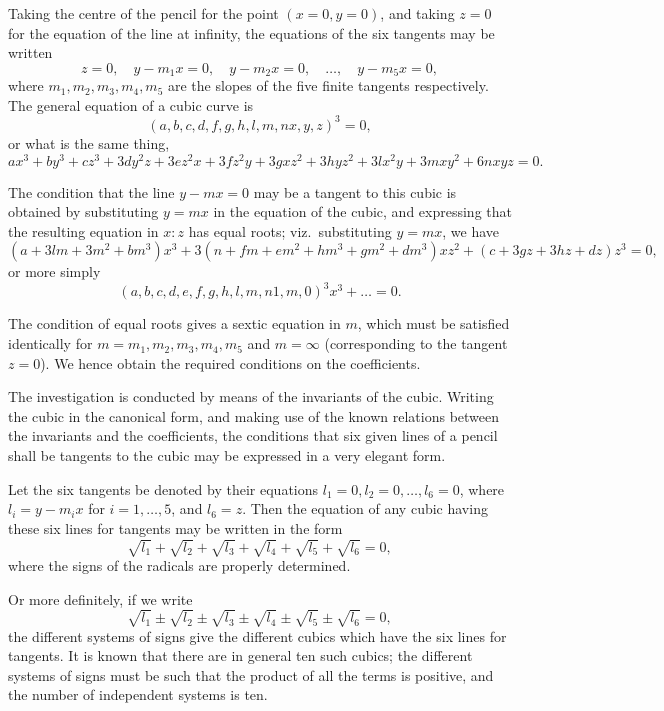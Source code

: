 \documentclass[11pt,a4paper]{article}
\theoremstyle{definition}
\begin{document}
Taking the centre of the pencil for the point $(x=0, y=0)$, and taking $z=0$ for the equation of the line at infinity, the equations of the six tangents may be written
\[
z = 0,\quad y - m_1x = 0,\quad y - m_2x = 0,\quad \dots,\quad y - m_5x = 0,
\]
where $m_1, m_2, m_3, m_4, m_5$ are the slopes of the five finite tangents respectively. The general equation of a cubic curve is
\[
(a,b,c,d,f,g,h,l,m,n x,y,z)^3 = 0,
\]
or what is the same thing,
\[
ax^3 + by^3 + cz^3 + 3dy^2z + 3ez^2x + 3fz^2y + 3gxz^2 + 3hyz^2 + 3lx^2y + 3mxy^2 + 6nxyz = 0.
\]

The condition that the line $y - mx = 0$ may be a tangent to this cubic is obtained by substituting $y = mx$ in the equation of the cubic, and expressing that the resulting equation in $x:z$ has equal roots; viz.\ substituting $y = mx$, we have
\[
(a + 3lm + 3m^2 + bm^3)x^3 + 3(n + fm + em^2 + hm^3 + gm^2 + dm^3)xz^2 + (c + 3gz + 3hz + dz)z^3 = 0,
\]
or more simply
\[
(a,b,c,d,e,f,g,h,l,m,n 1,m,0)^3 x^3 + \dots = 0.
\]

The condition of equal roots gives a sextic equation in $m$, which must be satisfied identically for $m = m_1, m_2, m_3, m_4, m_5$ and $m = \infty$ (corresponding to the tangent $z = 0$). We hence obtain the required conditions on the coefficients.

The investigation is conducted by means of the invariants of the cubic. Writing the cubic in the canonical form, and making use of the known relations between the invariants and the coefficients, the conditions that six given lines of a pencil shall be tangents to the cubic may be expressed in a very elegant form.

Let the six tangents be denoted by their equations $l_1 = 0, l_2 = 0, \dots, l_6 = 0$, where $l_i = y - m_ix$ for $i = 1, \dots, 5$, and $l_6 = z$. Then the equation of any cubic having these six lines for tangents may be written in the form
\[
\sqrt{l_1} + \sqrt{l_2} + \sqrt{l_3} + \sqrt{l_4} + \sqrt{l_5} + \sqrt{l_6} = 0,
\]
where the signs of the radicals are properly determined.

\newpage

Or more definitely, if we write
\[
\sqrt{l_1} \pm \sqrt{l_2} \pm \sqrt{l_3} \pm \sqrt{l_4} \pm \sqrt{l_5} \pm \sqrt{l_6} = 0,
\]
the different systems of signs give the different cubics which have the six lines for tangents. It is known that there are in general ten such cubics; the different systems of signs must be such that the product of all the terms is positive, and the number of independent systems is ten.
\end{document}
